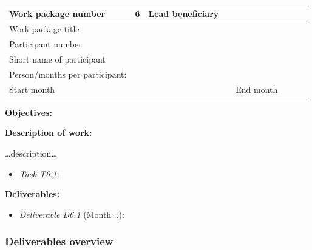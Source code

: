 \documentclass[]{article}
\providecommand{\tightlist}{%
  \setlength{\itemsep}{0pt}\setlength{\parskip}{0pt}}
\begin{document}
\begin{longtable}[]{@{}llllllll@{}}
\toprule
Work package number & 6 & Lead beneficiary & & & & &\tabularnewline
\midrule
\endhead
Work package title & & & & & & &\tabularnewline
Participant number & & & & & & &\tabularnewline
Short name of participant & & & & & & &\tabularnewline
Person/months per participant: & & & & & & &\tabularnewline
Start month & & & & End month & & &\tabularnewline
\bottomrule
\end{longtable}

\textbf{Objectives:}

\textbf{Description of work:}

\ldots{}description\ldots{}

\begin{itemize}
\tightlist
\item
  \emph{Task T6.1}:
\end{itemize}

\textbf{Deliverables:}

\begin{itemize}
\tightlist
\item
  \emph{Deliverable D6.1} (Month ..):
\end{itemize}

\hypertarget{deliverables-overview}{%
\subsubsection{Deliverables overview}\label{deliverables-overview}}
\end{document}
